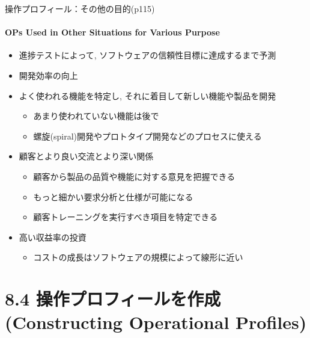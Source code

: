 \begin{frame}{操作プロフィール：その他の目的(p115)}
\framesubtitle{OPs Used in Other Situations for Various Purpose}
\begin{itemize}
\item<+-> 進捗テストによって, ソフトウェアの信頼性目標に達成するまで予測
\item<+-> 開発効率の向上
\item<+-> よく使われる機能を特定し, それに着目して新しい機能や製品を開発
    \begin{itemize}
    \item あまり使われていない機能は後で
    \item 螺旋(spiral)開発やプロトタイプ開発などのプロセスに使える
    \end{itemize}
\item<+-> 顧客とより良い交流とより深い関係
    \begin{itemize}
    \item 顧客から製品の品質や機能に対する意見を把握できる
    \item もっと細かい要求分析と仕様が可能になる
    \item 顧客トレーニングを実行すべき項目を特定できる
    \end{itemize}
\item<+-> 高い収益率の投資
    \begin{itemize}
    \item コストの成長はソフトウェアの規模によって線形に近い
    \end{itemize}
\end{itemize}
\end{frame}
\section{8.4 操作プロフィールを作成(Constructing Operational Profiles)}
